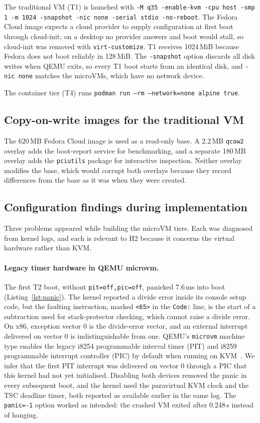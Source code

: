 \documentclass[pdflatex,sn-mathphys-num]{sn-jnl}%
\begin{document}
The traditional VM (T1) is launched with \texttt{-M q35 -enable-kvm -cpu host -smp 1 -m 1024 -snapshot -nic none -serial stdio -no-reboot}. The Fedora Cloud image expects a cloud provider to supply configuration at first boot through cloud-init; on a desktop no provider answers and boot would stall, so cloud-init was removed with \texttt{virt-customize}. T1 receives 1024\,MiB because Fedora does not boot reliably in 128\,MiB. The \texttt{-snapshot} option discards all disk writes when QEMU exits, so every T1 boot starts from an identical disk, and \texttt{-nic none} matches the microVMs, which have no network device.

The container tier (T4) runs \texttt{podman run --rm --network=none alpine true}.

\subsection{Copy-on-write images for the traditional VM}

The 620\,MB Fedora Cloud image is used as a read-only base. A 2.2\,MB \texttt{qcow2} overlay adds the boot-report service for benchmarking, and a separate 180\,MB overlay adds the \texttt{pciutils} package for interactive inspection. Neither overlay modifies the base, which would corrupt both overlays because they record differences from the base as it was when they were created.

\subsection{Configuration findings during implementation}\label{sec:findings}

Three problems appeared while building the microVM tiers. Each was diagnosed from kernel logs, and each is relevant to H2 because it concerns the virtual hardware rather than KVM.

\paragraph{Legacy timer hardware in QEMU microvm.}
The first T2 boot, without \texttt{pit=off,pic=off}, panicked 7.6\,ms into boot (Listing~\ref{lst:panic}). The kernel reported a divide error inside its console setup code, but the faulting instruction, marked \texttt{<65>} in the \texttt{Code:} line, is the start of a subtraction used for stack-protector checking, which cannot raise a divide error. On x86, exception vector 0 is the divide-error vector, and an external interrupt delivered on vector 0 is indistinguishable from one. QEMU's \texttt{microvm} machine type enables the legacy i8254 programmable interval timer (PIT) and i8259 programmable interrupt controller (PIC) by default when running on KVM~\cite{qemumicrovm}. We infer that the first PIT interrupt was delivered on vector 0 through a PIC that this kernel had not yet initialised. Disabling both devices removed the panic in every subsequent boot, and the kernel used the paravirtual KVM clock and the TSC deadline timer, both reported as available earlier in the same log. The \texttt{panic=-1} option worked as intended: the crashed VM exited after 0.248\,s instead of hanging.
\end{document}
